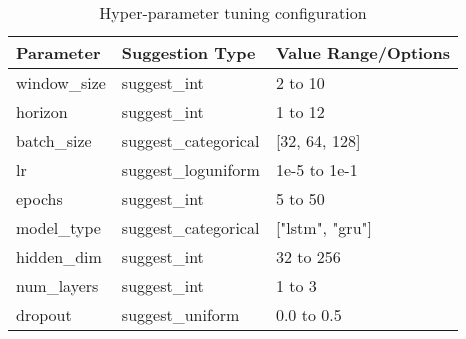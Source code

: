 \begin{table}[h]
    \centering
    \scriptsize
    \begin{tabular}{|l|l|l|}
        \hline
        \textbf{Parameter} & \textbf{Suggestion Type} & \textbf{Value Range/Options} \\
        \hline
        window\_size       & suggest\_int             & 2 to 10                      \\
        \hline
        horizon            & suggest\_int             & 1 to 12                      \\
        \hline
        batch\_size        & suggest\_categorical     & [32, 64, 128]                \\
        \hline
        lr                 & suggest\_loguniform      & 1e-5 to 1e-1                 \\
        \hline
        epochs             & suggest\_int             & 5 to 50                      \\
        \hline
        model\_type        & suggest\_categorical     & ["lstm", "gru"]              \\
        \hline
        hidden\_dim        & suggest\_int             & 32 to 256                    \\
        \hline
        num\_layers        & suggest\_int             & 1 to 3                       \\
        \hline
        dropout            & suggest\_uniform         & 0.0 to 0.5                   \\
        \hline
    \end{tabular}
    \caption{Hyper-parameter tuning configuration}
    \label{tab:hyperparameters}
\end{table}